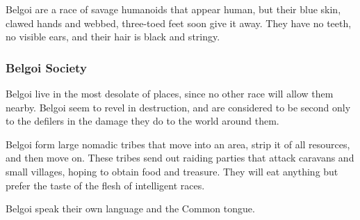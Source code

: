 Belgoi are a race of savage humanoids that appear human, but their blue skin, clawed hands and webbed, three-toed feet soon give it away. They have no teeth, no visible ears, and their hair is black and stringy.

\subsubsection{Belgoi Society}
Belgoi live in the most desolate of places, since no other race will allow them nearby. Belgoi seem to revel in destruction, and are considered to be second only to the defilers in the damage they do to the world around them.

Belgoi form large nomadic tribes that move into an area, strip it of all resources, and then move on. These tribes send out raiding parties that attack caravans and small villages, hoping to obtain food and treasure. They will eat anything but prefer the taste of the flesh of intelligent races.

Belgoi speak their own language and the Common tongue.


